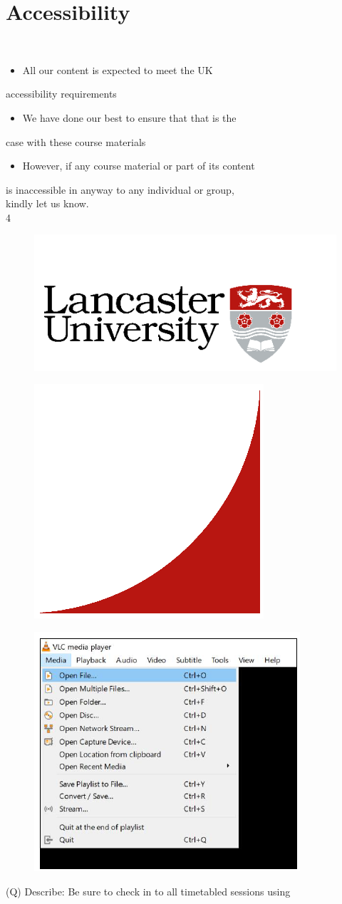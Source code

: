 \documentclass[12pt]{article}
\begin{document}
\section{Accessibility}
\\
\begin{itemize}
  \item All our content is expected to meet the UK 
\end{itemize}
accessibility requirements\\
\begin{itemize}
  \item We have done our best to ensure that that is the 
\end{itemize}
case with these course materials\\
\begin{itemize}
  \item However, if any course material or part of its content 
\end{itemize}
is inaccessible in anyway to any individual or group, \\
kindly let us know.\\
4\\
\begin{figure}[H]
\includegraphics[width=0.5\linewidth]{page1-image-1.png}
\end{figure}
\begin{figure}[H]
\includegraphics[width=0.5\linewidth]{page1-image-2.png}
\end{figure}
\begin{figure}[H]
\includegraphics[width=0.5\linewidth]{page1-image-3.png}
\end{figure}
\clearpage
(Q)
Describe: Be sure to check in to all timetabled sessions using 
\clearpage
\end{document}
